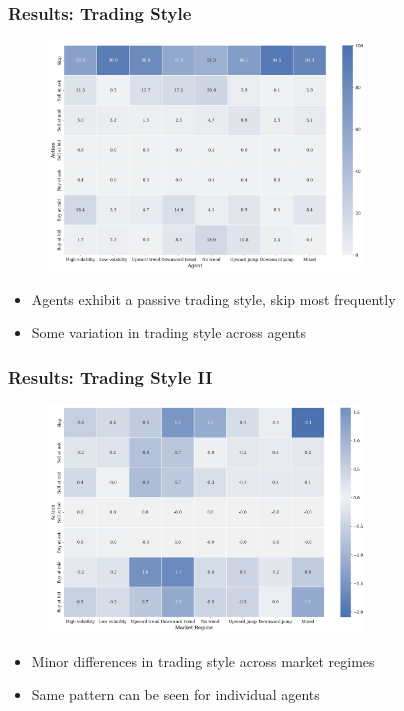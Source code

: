 \documentclass{beamer}
\begin{document}
\begin{frame}
  \frametitle{Results: Trading Style}

  \begin{figure}
    \centering
    \includegraphics[width=0.75\textwidth]{figures/action_heatmap.png}
  \end{figure}

  \begin{itemize}
    \item Agents exhibit a passive trading style, skip most frequently
    \item Some variation in trading style across agents
  \end{itemize}

\end{frame}

\begin{frame}
  \frametitle{Results: Trading Style II}

  \begin{figure}
    \centering
    \includegraphics[width=0.75\textwidth]{figures/regime_action_heatmap.png}
  \end{figure}

  \begin{itemize}
    \item Minor differences in trading style across market regimes
    \item Same pattern can be seen for individual agents
  \end{itemize}

\end{frame}
\end{document}

